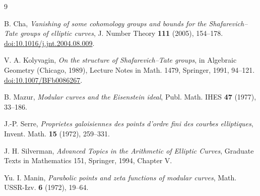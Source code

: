 \documentclass[11pt]{article}
\begin{document}
\begin{thebibliography}{9}

B. Cha,
\emph{Vanishing of some cohomology groups and bounds for the
Shafarevich--Tate groups of elliptic curves},
J. Number Theory \textbf{111} (2005), 154--178.
\href{https://doi.org/10.1016/j.jnt.2004.08.009}
{doi:10.1016/j.jnt.2004.08.009}.

V. A. Kolyvagin,
\emph{On the structure of Shafarevich--Tate groups},
in Algebraic Geometry (Chicago, 1989), Lecture Notes in Math. 1479,
Springer, 1991, 94--121.
\href{https://doi.org/10.1007/BFb0086267}{doi:10.1007/BFb0086267}.

B. Mazur,
\emph{Modular curves and the Eisenstein ideal},
Publ. Math. IHES \textbf{47} (1977), 33--186.

J.-P. Serre,
\emph{Proprietes galoisiennes des points d'ordre fini des courbes
elliptiques},
Invent. Math. \textbf{15} (1972), 259--331.

J. H. Silverman,
\emph{Advanced Topics in the Arithmetic of Elliptic Curves},
Graduate Texts in Mathematics 151, Springer, 1994, Chapter V.

Yu. I. Manin,
\emph{Parabolic points and zeta functions of modular curves},
Math. USSR-Izv. \textbf{6} (1972), 19--64.

\end{thebibliography}
\end{document}
